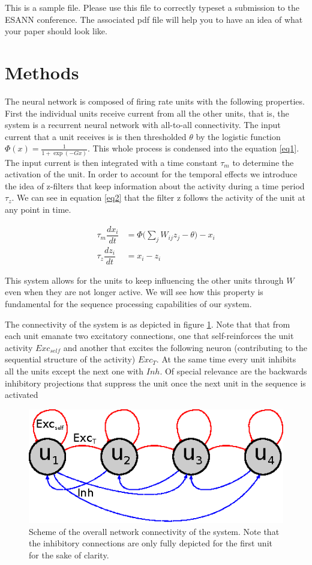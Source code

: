 \documentclass{esannV2}
\begin{document}
This is a sample file. Please use this file to correctly typeset a
submission to the ESANN conference. The associated pdf file will
help you to have an idea of what your paper should look like.

\section{Methods}
The neural network is composed of firing rate units with the following properties. First the individual units receive current from all the other units, that is, the system is a recurrent neural network with all-to-all connectivity. The input current that a unit receives is  is then  thresholded $\theta$ by the logistic function $\Phi(x) = \frac{1}{1 + \exp(-Gx)}$. This whole process is condensed into the equation \ref{eq1}. The input current is then integrated with a time constant $\tau_m$ to determine the activation of the unit. In order to account for the temporal effects we introduce the idea of z-filters that keep information about the activity during a time period $\tau_z$. We can see in equation \ref{eq2} that the filter z follows the activity of the unit at any point in time.

\begin{align}
\tau_m \dfrac{dx_i}{dt} &= \Phi\Big(\sum_{j} W_{ij} z_j - \theta \Big) - x_i \label{eq1} \\ 
\tau_z \dfrac{dz_i}{dt} &= x_i - z_i \label{eq2}
\end{align}

This system allows for the units to keep influencing the other units through $W$ even when they are not longer active. We will see how this property is fundamental for the sequence processing capabilities of our system. 

The connectivity of the system is as depicted in figure \ref{Fig:diagram}. Note that that from each unit emanate two excitatory connections, one that self-reinforces the unit activity $Exc_{self}$ and another that excites the following neuron (contributing to the sequential structure of the activity) $Exc_T$. At the same time every unit inhibits all the units except the next one with $Inh$. Of special relevance are the backwards inhibitory projections that suppress the unit once the next unit in the sequence is activated 

\begin{figure}[h!]
\centering
\includegraphics[scale=1.5]{diagram.eps}
\caption{Scheme of the overall network connectivity of the system. Note that the inhibitory connections are only fully depicted for the first unit for the sake of clarity.}\label{Fig:diagram}
\end{figure}
\end{document}
